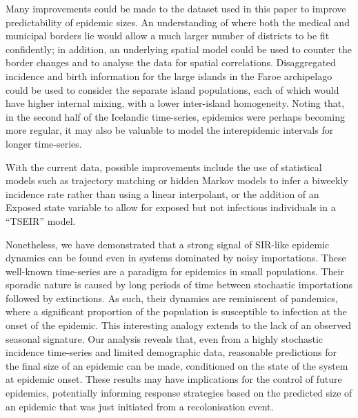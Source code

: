 \documentclass[10pt]{article}
\begin{document}
Many improvements could be made to the dataset used in this paper to improve predictability of epidemic sizes. An understanding of where both the medical and municipal borders lie would allow a much larger number of districts to be fit confidently; in addition, an underlying spatial model could be used to counter the border changes and to analyse the data for spatial correlations. Disaggregated incidence and birth information for the large islands in the Faroe archipelago could be used to consider the separate island populations, each of which would have higher internal mixing, with a lower inter-island homogeneity. Noting that, in the second half of the Icelandic time-series, epidemics were perhaps becoming more regular, it may also be valuable to model the interepidemic intervals for longer time-series. 

With the current data, possible improvements include the use of statistical models such as trajectory matching or hidden Markov models to infer a biweekly incidence rate rather than using a linear interpolant, or the addition of an Exposed state variable to allow for exposed but not infectious individuals in a ``TSEIR'' model. 

Nonetheless, we have demonstrated that a strong signal of SIR-like epidemic dynamics can be found even in systems dominated by noisy importations. These well-known time-series \cite{Cliff1981, Cliff2000} are a paradigm for epidemics in small populations. Their sporadic nature is caused by long periods of time between stochastic importations followed by extinctions. As such, their dynamics are reminiscent of pandemics, where a significant proportion of the population is susceptible to infection at the onset of the epidemic. This interesting analogy extends to the lack of an observed seasonal signature. Our analysis reveals that, even from a highly stochastic incidence time-series and limited demographic data, reasonable predictions for the final size of an epidemic can be made, conditioned on the state of the system at epidemic onset. These results may have implications for the control of future epidemics, potentially informing response strategies based on the predicted size of an epidemic that was just initiated from a recolonisation event.
\end{document}
